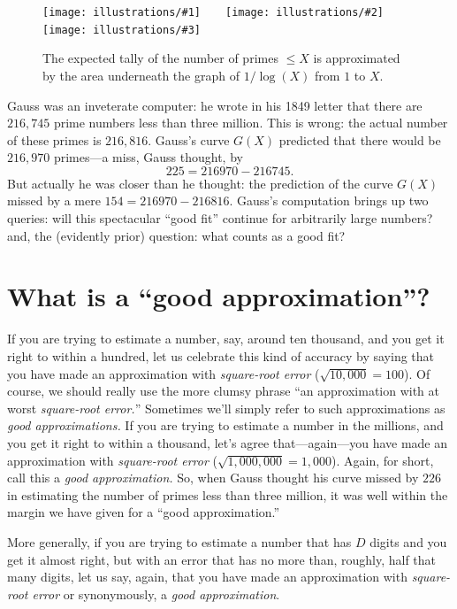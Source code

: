 \documentclass[openany]{book}
\newcommand{\illthree}[5]{%
   \begin{figure}[H]%
\centering%
   \texttt{[image: illustrations/\#1]}$\qquad$\texttt{[image: illustrations/\#2]}$\qquad$\texttt{[image: illustrations/\#3]}%
   \caption{#5}%
    \end{figure}}
\theoremstyle{plain}
\theoremstyle{definition}
\begin{document}
\illthree{area_under_log_graph_30}{area_under_log_graph_100}{area_under_log_graph_1000}{.27}{The
  expected tally of the number of primes $\leq X$ is approximated by the
  area underneath the graph of $1/\log(X)$ from $1$ to $X$.\label{fig:G}}


Gauss was an inveterate computer:
he wrote in his 1849 letter  that
there are $216{,}745$ prime numbers less than three million.  This is
wrong: the actual number of these primes is $216{,}816$. Gauss's curve $G(X)$
predicted that there would be $216{,}970$ primes---a miss, Gauss
thought, by
$$225 = 216970 - 216745.$$
But actually he was closer than he thought: the
prediction of the curve $G(X)$ missed by a mere $154 = 216970  - 216816$.
Gauss's computation brings up two queries: will this spectacular ``good
fit'' continue for arbitrarily large numbers? and, the (evidently
prior) question: what counts as a good fit?



\chapter{What is a ``good approximation''?}\label{sec:sqrterror}

If you are trying to estimate a number, say, around ten thousand, and
you get it right to within a hundred, let us celebrate this kind of
accuracy by saying that you have made an approximation with {\em
  square-root error} (${\sqrt{10{,}000}}=100$). Of course, we should
really use the more clumsy phrase ``an approximation with at worst
{\em square-root error.}''  Sometimes we'll simply refer to such
approximations as {\em good approximations.} If you are trying to
estimate a number in the millions, and you get it right to within a
thousand, let's agree that---again---you have made an approximation
with {\em square-root error} (${\sqrt{1{,}000{,}000}}=1{,}000$).
Again, for short, call this a {\em good approximation.} So, when Gauss
thought his curve missed by $226$ in estimating the number of primes
less than three million, it was well within the margin we have given
for a ``good approximation.''


More generally, if you are trying to estimate a number that has $D$
digits and you get it almost right, but with an error that has no more
than, roughly, half that many digits, let us say, again, that you have
made an approximation with {\em square-root error} or synonymously, a
{\em good approximation}.
\end{document}
